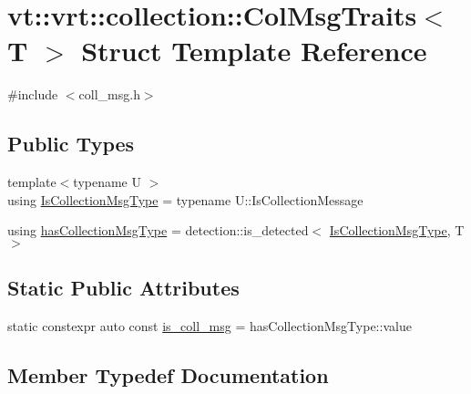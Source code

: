 \hypertarget{structvt_1_1vrt_1_1collection_1_1_col_msg_traits}{}\section{vt\+:\+:vrt\+:\+:collection\+:\+:Col\+Msg\+Traits$<$ T $>$ Struct Template Reference}
\label{structvt_1_1vrt_1_1collection_1_1_col_msg_traits}


{\ttfamily \#include $<$coll\+\_\+msg.\+h$>$}

\subsection*{Public Types}
\begin{DoxyCompactItemize}
\item 
{\footnotesize template$<$typename U $>$ }\\using \hyperlink{structvt_1_1vrt_1_1collection_1_1_col_msg_traits_ace04bfcf053b51736d5aec0d28b5274b}{Is\+Collection\+Msg\+Type} = typename U\+::\+Is\+Collection\+Message
\item 
using \hyperlink{structvt_1_1vrt_1_1collection_1_1_col_msg_traits_aa181d98e798e8846ceb8f1c8b8204a7e}{has\+Collection\+Msg\+Type} = detection\+::is\+\_\+detected$<$ \hyperlink{structvt_1_1vrt_1_1collection_1_1_col_msg_traits_ace04bfcf053b51736d5aec0d28b5274b}{Is\+Collection\+Msg\+Type}, T $>$
\end{DoxyCompactItemize}
\subsection*{Static Public Attributes}
\begin{DoxyCompactItemize}
\item 
static constexpr auto const \hyperlink{structvt_1_1vrt_1_1collection_1_1_col_msg_traits_a8eb18b4bd6ca875aa981c1998a69896d}{is\+\_\+coll\+\_\+msg} = has\+Collection\+Msg\+Type\+::value
\end{DoxyCompactItemize}


\subsection{Member Typedef Documentation}
\mbox{\label{structvt_1_1vrt_1_1collection_1_1_col_msg_traits_aa181d98e798e8846ceb8f1c8b8204a7e}} 
